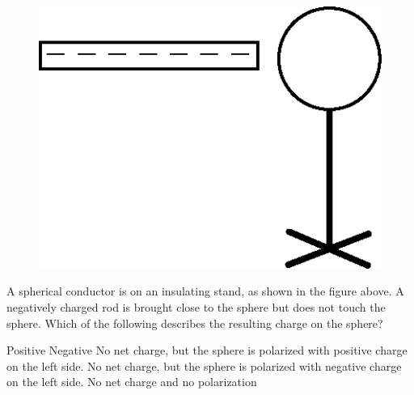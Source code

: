 \begin{figure}[H]
\centering
\includegraphics[scale=0.25]{images/img-007-021.png}
\end{figure}

\begin{questions}\setcounter{question}{9}\question
A spherical conductor is on an insulating stand, as shown in the figure above. A negatively charged rod is brought close to the sphere but does not touch the sphere. Which of the following describes the resulting charge on the sphere?

\begin{choices}
\choice Positive
\choice Negative
\choice No net charge, but the sphere is polarized with positive charge on the left side.
\choice No net charge, but the sphere is polarized with negative charge on the left side.
\choice No net charge and no polarization
\end{choices}\end{questions}

